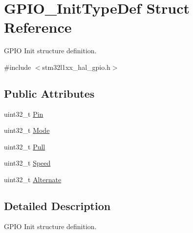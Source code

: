 \hypertarget{struct_g_p_i_o___init_type_def}{\section{G\-P\-I\-O\-\_\-\-Init\-Type\-Def Struct Reference}
\label{struct_g_p_i_o___init_type_def}
}


G\-P\-I\-O Init structure definition.  




{\ttfamily \#include $<$stm32l1xx\-\_\-hal\-\_\-gpio.\-h$>$}

\subsection*{Public Attributes}
\begin{DoxyCompactItemize}
\item 
uint32\-\_\-t \hyperlink{struct_g_p_i_o___init_type_def_aa807fb62b2b2cf937092abba81370b87}{Pin}
\item 
uint32\-\_\-t \hyperlink{struct_g_p_i_o___init_type_def_a3731d84343e65a98fdf51056a8d30321}{Mode}
\item 
uint32\-\_\-t \hyperlink{struct_g_p_i_o___init_type_def_aa2d3a6b0c4e10ac20882b4a37799ced1}{Pull}
\item 
uint32\-\_\-t \hyperlink{struct_g_p_i_o___init_type_def_aae3b8ba407fb4f974cbce9cc03fc189d}{Speed}
\item 
uint32\-\_\-t \hyperlink{struct_g_p_i_o___init_type_def_aa1bf7132c974a10589d6574d50465256}{Alternate}
\end{DoxyCompactItemize}


\subsection{Detailed Description}
G\-P\-I\-O Init structure definition. 

